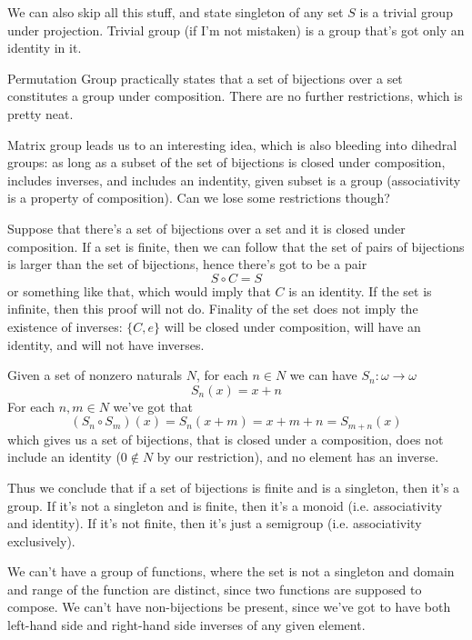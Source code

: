 \documentclass[11pt,oneside,titlepage]{book}
\newcommand{\set}[1]{\{ #1 \}}
\begin{document}
We can also skip all this stuff, and state singleton of any set $S$ is
a trivial group under projection. Trivial group (if I'm not mistaken) is a
group that's got only an identity in it.

Permutation Group practically states that a set of bijections over a
set constitutes a group under composition. There are no further
restrictions, which is pretty neat.

Matrix group leads us to an interesting idea, which is also bleeding
into dihedral groups: as long as a subset of the set of bijections is
closed under composition, includes inverses, and includes an
indentity, given subset is a group (associativity is a property of
composition). Can we lose some restrictions though?

Suppose that there's a set of bijections over a set and it is closed
under composition. If a set is finite, then we can follow that the set of pairs of
bijections is larger than the set of bijections, hence there's got to be a pair
$$S \circ C = S$$
or something like that, which would imply that $C$ is an identity.
If the set is infinite, then this proof will not do.
Finality of the set does not imply the existence of inverses: $\set{C, e}$ will be
closed under composition, will have an identity, and will not have inverses.

Given a set of nonzero naturals $N$, for each $n \in N$ we can have $S_n: \omega \to \omega$
$$S_n(x) = x + n$$
For each $n, m \in N$ we've got that
$$(S_n \circ S_m)(x) = S_n(x + m) = x + m + n = S_{m + n}(x)$$
which gives us a set of bijections, that is closed under a
composition, does not include an identity ($0 \notin N$ by our
restriction), and no element has an inverse.

Thus we conclude that if a set of bijections is finite and is a singleton, then it's a group.
If it's not a singleton and is finite, then it's a monoid (i.e. associativity and identity).
If it's not finite, then it's just a semigroup (i.e. associativity exclusively).

We can't have a group of functions, where the set is not a singleton and
domain and range of the function are distinct, since two functions are supposed
to compose. We can't have non-bijections be present, since we've got to have
both left-hand side and right-hand side inverses of any given element.

\subsection{}
\end{document}
